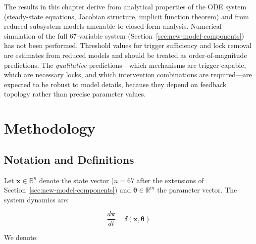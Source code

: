 \begin{limitation}
\label{lim:analytical-vs-numerical}
The results in this chapter derive from analytical properties of the ODE system (steady-state equations, Jacobian structure, implicit function theorem) and from reduced subsystem models amenable to closed-form analysis. Numerical simulation of the full 67-variable system (Section~\ref{sec:new-model-components}) has not been performed. Threshold values for trigger sufficiency and lock removal are estimates from reduced models and should be treated as order-of-magnitude predictions. The \emph{qualitative} predictions---which mechanisms are trigger-capable, which are necessary locks, and which intervention combinations are required---are expected to be robust to model details, because they depend on feedback topology rather than precise parameter values.
\end{limitation}

\section{Methodology}
\label{sec:causal-hierarchy-methodology}

\subsection{Notation and Definitions}

Let $\mathbf{x} \in \mathbb{R}^{n}$ denote the state vector ($n = 67$ after the extensions of Section~\ref{sec:new-model-components}) and $\boldsymbol{\theta} \in \mathbb{R}^{m}$ the parameter vector. The system dynamics are:

\begin{equation}
\label{eq:ode-system-ch33}
\frac{d\mathbf{x}}{dt} = \mathbf{f}(\mathbf{x}, \boldsymbol{\theta})
\end{equation}

We denote:


